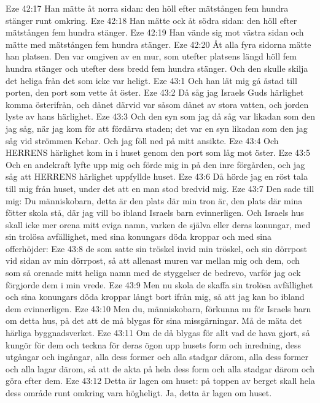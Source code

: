 Eze 42:17  Han mätte åt norra sidan: den höll efter mätstången fem hundra stänger runt omkring.
Eze 42:18  Han mätte ock åt södra sidan: den höll efter mätstången fem hundra stänger.
Eze 42:19  Han vände sig mot västra sidan och mätte med mätstången fem hundra stänger.
Eze 42:20  Åt alla fyra sidorna mätte han platsen. Den var omgiven av en mur, som utefter platsens längd höll fem hundra stänger och utefter dess bredd fem hundra stänger. Och den skulle skilja det heliga från det som icke var heligt.
Eze 43:1  Och han lät mig gå åstad till porten, den port som vette åt öster.
Eze 43:2  Då såg jag Israels Guds härlighet komma österifrån, och dånet därvid var såsom dånet av stora vatten, och jorden lyste av hans härlighet.
Eze 43:3  Och den syn som jag då såg var likadan som den jag såg, när jag kom för att fördärva staden; det var en syn likadan som den jag såg vid strömmen Kebar. Och jag föll ned på mitt ansikte.
Eze 43:4  Och HERRENS härlighet kom in i huset genom den port som låg mot öster.
Eze 43:5  Och en andekraft lyfte upp mig och förde mig in på den inre förgården, och jag såg att HERRENS härlighet uppfyllde huset.
Eze 43:6  Då hörde jag en röst tala till mig från huset, under det att en man stod bredvid mig.
Eze 43:7  Den sade till mig: Du människobarn, detta är den plats där min tron är, den plats där mina fötter skola stå, där jag vill bo ibland Israels barn evinnerligen. Och Israels hus skall icke mer orena mitt eviga namn, varken de själva eller deras konungar, med sin trolösa avfällighet, med sina konungars döda kroppar och med sina offerhöjder:
Eze 43:8  de som satte sin tröskel invid min tröskel, och sin dörrpost vid sidan av min dörrpost, så att allenast muren var mellan mig och dem, och som så orenade mitt heliga namn med de styggelser de bedrevo, varför jag ock förgjorde dem i min vrede.
Eze 43:9  Men nu skola de skaffa sin trolösa avfällighet och sina konungars döda kroppar långt bort ifrån mig, så att jag kan bo ibland dem evinnerligen.
Eze 43:10  Men du, människobarn, förkunna nu för Israels barn om detta hus, på det att de må blygas för sina missgärningar. Må de mäta det härliga byggnadsverket.
Eze 43:11  Om de då blygas för allt vad de hava gjort, så kungör för dem och teckna för deras ögon upp husets form och inredning, dess utgångar och ingångar, alla dess former och alla stadgar därom, alla dess former och alla lagar därom, så att de akta på hela dess form och alla stadgar därom och göra efter dem.
Eze 43:12  Detta är lagen om huset: på toppen av berget skall hela dess område runt omkring vara högheligt. Ja, detta är lagen om huset.
